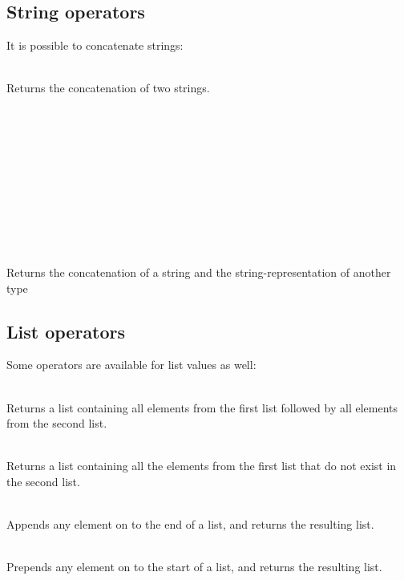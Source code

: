 \subsection{String operators}

It is possible to concatenate strings:
\begin{dlist}
  \item {} \\
    Returns the concatenation of two strings.
  \item {} \\
    \\
    \\
    \\
    \\
    \\
    \\
    \\
    \\
    \\
    Returns the concatenation of a string and the string-representation of another type
\end{dlist}

\subsection{List operators}

Some operators are available for list values as well:
\begin{dlist}
\item {} \\
  Returns a list containing all elements from the first list followed
  by all elements from the second list.
\item {} \\
  Returns a list containing all the elements from the first list that
  do not exist in the second list.
\item {} \\
  Appends any element on to the end of a list, and returns the resulting list.
\item {} \\
  Prepends any element on to the start of a list, and returns the resulting list.
\end{dlist}


